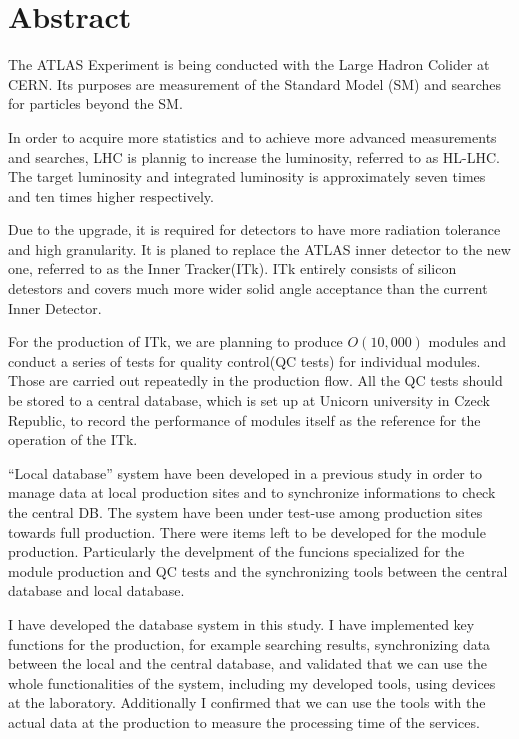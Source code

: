 \chapter*{Abstract}

The ATLAS Experiment is being conducted with the Large Hadron Colider at CERN. Its purposes are measurement of the Standard Model (SM) and searches for particles beyond the SM.

In order to acquire more statistics and to achieve more advanced measurements and searches, LHC is plannig to increase the luminosity, referred to as HL-LHC.
The target luminosity and integrated luminosity is approximately seven times and ten times higher respectively.

Due to the upgrade, it is required for detectors to have more radiation tolerance and high granularity. 
It is planed to replace the ATLAS inner detector to the new one, referred to as the Inner Tracker(ITk). 
ITk entirely consists of silicon detestors and covers much more wider solid angle acceptance than the current Inner Detector.

For the production of ITk, we are planning to produce $O(10,000)$ modules and conduct a series of tests for quality control(QC tests) for individual modules. 
Those are carried out repeatedly in the production flow.
All the QC tests should be stored to a central database, which is set up at Unicorn university in Czeck Republic, to record the performance of modules itself as the reference for the operation of the ITk. 

``Local database'' system have been developed in a previous study in order to manage data at local production sites and to synchronize informations to check the central DB. The system have been under test-use among production sites towards full production.
There were items left to be developed for the module production. Particularly the develpment of the funcions specialized for the module production and QC tests and the synchronizing tools between the central database and local database.

I have developed the database system in this study.
I have implemented key functions for the production, for example searching results, synchronizing data between the local and the central database, and validated that we can use the whole functionalities of the system, including my developed tools, using devices at the laboratory. 
Additionally I confirmed that we can use the tools with the actual data at the production to measure the processing time of the services.

